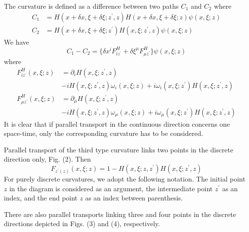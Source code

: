 \documentclass[12pt,a4paper]{article}
\begin{document}
The curvature is defined as a difference between two paths $C_{1}$ and $C_{2}
$ where
\begin{align}
C_{1}  & =H\left(  x+\delta x,\xi+\delta\xi;z^{\prime},z\right)  H\left(
x+\delta x,\xi+\delta\xi;z\right)  \psi\left(  x,\xi;z\right) \\
C_{2}  & =H\left(  x+\delta x,\xi+\delta\xi;z^{\prime}\right)  H\left(
x,\xi;z^{\prime},z\right)  \psi\left(  x,\xi;z\right)
\end{align}
We have
\begin{equation}
C_{1}-C_{2}=\{\delta x^{i}F_{iz^{\prime}}^{H}+\delta\xi^{\mu}F_{\mu z^{\prime
}}^{H}\}\psi\left(  x,\xi;z\right)
\end{equation}
where
\begin{align}
F_{iz^{\prime}}^{H}\left(  x,\xi;z\right)   & =\partial_{i}H\left(
x,\xi;z^{\prime},z\right) \\
& -iH\left(  x,\xi;z^{\prime},z\right)  \omega_{i}(x,\xi;z)+i\omega_{i}%
(x,\xi;z^{\prime})H\left(  x,\xi;z^{\prime},z\right) \nonumber\\
F_{\mu z^{\prime}}^{H}\left(  x,\xi;z\right)   & =\partial_{\mu}H\left(
x,\xi;z^{\prime},z\right) \\
& -iH\left(  x,\xi;z^{\prime},z\right)  \omega_{\mu}(x,\xi;z)+i\omega_{\mu
}(x,\xi;z^{\prime})H\left(  x,\xi;z^{\prime},z\right) \nonumber
\end{align}
It is clear that if parallel transport in the continuous direction concerns
one space-time, only the corresponding curvature has to be considered.

Parallel transport of the third type curvature links two points in the
discrete direction only, Fig. (2). Then
\begin{equation}
F_{z^{\prime}(z)}\left(  x,\xi;z\right)  =1-H\left(  x,\xi;z,z^{\prime
}\right)  H\left(  x,\xi;z^{\prime},z\right) \label{f2z}%
\end{equation}
For purely discrete curvatures, we adopt the following notation. The initial
point $z$ in the diagram is considered as an argument, the intermediate point
$z^{\prime}$ as an index, and the end point $z$ as an index between parenthesis.

There are also parallel transports linking three and four points in the
discrete directions depicted in Figs. (3) and (4), respectively.%
\end{document}
